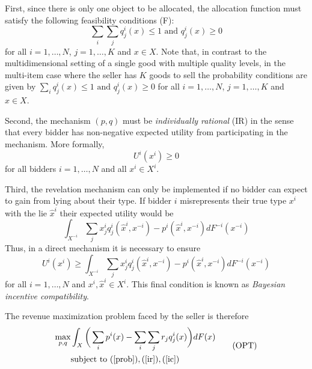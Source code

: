 \documentclass{article}
\begin{document}
First, since there is only one object to be allocated, the allocation function must satisfy the following feasibility conditions (F):
\begin{equation}\label{prob}
    \sum_i \sum_j q_j^i(x) \leq 1 \text{ and } q_j^i(x) \geq 0 \tag{F}
\end{equation}
\noindent for all $i=1,\dots,N$, $j=1,\dots,K$ and $x \in X$. Note that, in contrast to the multidimensional setting of a single good with multiple quality levels, in the multi-item case where the seller has $K$ goods to sell the probability conditions are given by $\sum_i q_j^i(x) \leq 1 \text{ and } q_j^i(x) \geq 0$ for all $i=1,\dots,N$, $j=1,\dots,K$ and $x \in X$.

Second, the mechanism $(p,q)$ must be \textit{individually rational} (IR) in the sense that every bidder has non-negative expected utility from participating in the mechanism. More formally,
\begin{equation}\label{ir}
    U^i(x^i) \geq 0 \tag{IR}
\end{equation}
\noindent for all bidders $i=1,\dots,N$ and all $x^i \in X^i$.

Third, the revelation mechanism can only be implemented if no bidder can expect to gain from lying about their type. If bidder $i$ misrepresents their true type $x^i$ with the lie $\widehat{x}^i$ their expected utility would be
\begin{equation}
    \int_{X^{-i}} \sum_j x_j^i q_j^i(\widehat{x}^i,x^{-i}) - p^i(\widehat{x}^i,x^{-i}) dF^{-i}(x^{-i})
\end{equation}
\noindent Thus, in a direct mechanism it is necessary to ensure
\begin{equation}\label{ic}
    U^i(x^i) \geq \int_{X^{-i}} \sum_j x_j^i q_j^i(\widehat{x}^i,x^{-i}) - p^i(\widehat{x}^i,x^{-i}) dF^{-i}(x^{-i}) \tag{IC}
\end{equation}
\noindent for all $i=1,\dots,N$ and $x^i, \widehat{x}^i \in X^i$. This final condition is known as \textit{Bayesian incentive compatibility}.

The revenue maximization problem faced by the seller is therefore
\begin{equation}
\begin{aligned}\label{eq_opt}
    \max_{p,q} &\int_X \bigg( \sum_i p^i(x)  - \sum_i \sum_j r_j q_j^i(x) \bigg) dF(x) \\
    &\text{subject to } (\ref{prob}), (\ref{ir}), (\ref{ic})
\end{aligned}  \tag{OPT} 
\end{equation}
\end{document}
